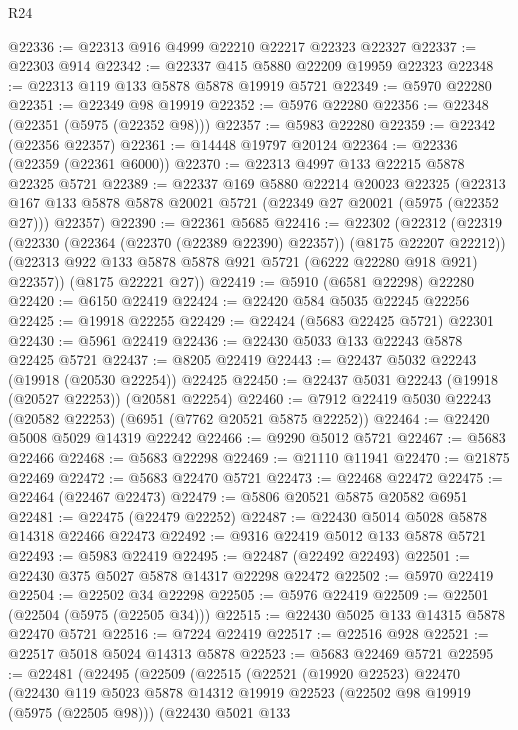 \begin{lexlean}{R24}
\begin{coremodule}
@22336 := @22313 @916 @4999 @22210 @22217 @22323 @22327
@22337 := @22303 @914
@22342 := @22337 @415 @5880 @22209 @19959 @22323
@22348 := @22313 @119 @133 @5878 @5878 @19919 @5721
@22349 := @5970 @22280
@22351 := @22349 @98 @19919
@22352 := @5976 @22280
@22356 := @22348 (@22351 (@5975 (@22352 @98)))
@22357 := @5983 @22280
@22359 := @22342 (@22356 @22357)
@22361 := @14448 @19797 @20124
@22364 := @22336 (@22359 (@22361 @6000))
@22370 := @22313 @4997 @133 @22215 @5878 @22325 @5721
@22389 := @22337
    @169
    @5880
    @22214
    @20023
    @22325
    (@22313 @167 @133 @5878 @5878 @20021 @5721 (@22349 @27 @20021 (@5975 (@22352 @27))) @22357)
@22390 := @22361 @5685
@22416 := @22302
    (@22312
      (@22319
        (@22330 (@22364 (@22370 (@22389 @22390) @22357)) (@8175 @22207 @22212))
        (@22313 @922 @133 @5878 @5878 @921 @5721 (@6222 @22280 @918 @921) @22357))
      (@8175 @22221 @27))
@22419 := @5910 (@6581 @22298) @22280
@22420 := @6150 @22419
@22424 := @22420 @584 @5035 @22245 @22256
@22425 := @19918 @22255
@22429 := @22424 (@5683 @22425 @5721) @22301
@22430 := @5961 @22419
@22436 := @22430 @5033 @133 @22243 @5878 @22425 @5721
@22437 := @8205 @22419
@22443 := @22437 @5032 @22243 (@19918 (@20530 @22254)) @22425
@22450 := @22437 @5031 @22243 (@19918 (@20527 @22253)) (@20581 @22254)
@22460 := @7912 @22419 @5030 @22243 (@20582 @22253) (@6951 (@7762 @20521 @5875 @22252))
@22464 := @22420 @5008 @5029 @14319 @22242
@22466 := @9290 @5012 @5721
@22467 := @5683 @22466
@22468 := @5683 @22298
@22469 := @21110 @11941
@22470 := @21875 @22469
@22472 := @5683 @22470 @5721
@22473 := @22468 @22472
@22475 := @22464 (@22467 @22473)
@22479 := @5806 @20521 @5875 @20582 @6951
@22481 := @22475 (@22479 @22252)
@22487 := @22430 @5014 @5028 @5878 @14318 @22466 @22473
@22492 := @9316 @22419 @5012 @133 @5878 @5721
@22493 := @5983 @22419
@22495 := @22487 (@22492 @22493)
@22501 := @22430 @375 @5027 @5878 @14317 @22298 @22472
@22502 := @5970 @22419
@22504 := @22502 @34 @22298
@22505 := @5976 @22419
@22509 := @22501 (@22504 (@5975 (@22505 @34)))
@22515 := @22430 @5025 @133 @14315 @5878 @22470 @5721
@22516 := @7224 @22419
@22517 := @22516 @928
@22521 := @22517 @5018 @5024 @14313 @5878
@22523 := @5683 @22469 @5721
@22595 := @22481
    (@22495
      (@22509
        (@22515
          (@22521
            (@19920 @22523)
            @22470
            (@22430
              @119
              @5023
              @5878
              @14312
              @19919
              @22523
              (@22502 @98 @19919 (@5975 (@22505 @98)))
              (@22430
                @5021
                @133

\end{coremodule}
\end{lexlean}
